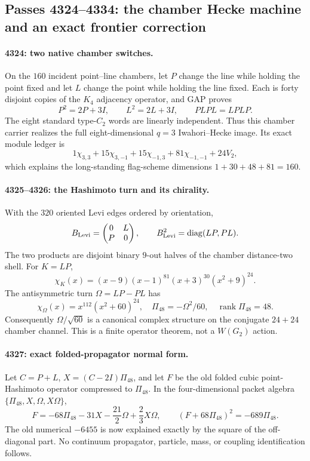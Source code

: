 \subsection*{Passes 4324--4334: the chamber Hecke machine and an exact frontier correction}

\paragraph{4324: two native chamber switches.}
On the $160$ incident point--line chambers, let $P$ change the line while holding the
point fixed and let $L$ change the point while holding the line fixed.  Each is forty
disjoint copies of the $K_4$ adjacency operator, and GAP proves
\[
 P^2=2P+3I,\qquad L^2=2L+3I,\qquad PLPL=LPLP.
\]
The eight standard type-$C_2$ words are linearly independent.  Thus this chamber carrier
realizes the full eight-dimensional $q=3$ Iwahori--Hecke image.  Its exact module ledger is
\[
 1\chi_{3,3}+15\chi_{3,-1}+15\chi_{-1,3}+81\chi_{-1,-1}+24V_2,
\]
which explains the long-standing flag-scheme dimensions $1+30+48+81=160$.

\paragraph{4325--4326: the Hashimoto turn and its chirality.}
With the $320$ oriented Levi edges ordered by orientation,
\[
 B_{\rm Levi}=\begin{pmatrix}0&L\\P&0\end{pmatrix},\qquad
 B_{\rm Levi}^2=\operatorname{diag}(LP,PL).
\]
The two products are disjoint binary $9$-out halves of the chamber distance-two shell.
For $K=LP$,
\[
 \chi_K(x)=(x-9)(x-1)^{81}(x+3)^{30}(x^2+9)^{24}.
\]
The antisymmetric turn $\Omega=LP-PL$ has
\[
 \chi_\Omega(x)=x^{112}(x^2+60)^{24},\quad
 \Pi_{48}=-\Omega^2/60,\quad \operatorname{rank}\Pi_{48}=48.
\]
Consequently $\Omega/\sqrt{60}$ is a canonical complex structure on the conjugate
$24+24$ chamber channel.  This is a finite operator theorem, not a $W(G_2)$ action.

\paragraph{4327: exact folded-propagator normal form.}
Let $C=P+L$, $X=(C-2I)\Pi_{48}$, and let $F$ be the old folded cubic point-Hashimoto
operator compressed to $\Pi_{48}$.  In the four-dimensional packet algebra
$\{\Pi_{48},X,\Omega,X\Omega\}$,
\[
 F=-68\Pi_{48}-31X-\frac{21}{2}\Omega+\frac23X\Omega,
 \qquad (F+68\Pi_{48})^2=-689\Pi_{48}.
\]
The old numerical $-6455$ is now explained exactly by the square of the off-diagonal
part.  No continuum propagator, particle, mass, or coupling identification follows.

